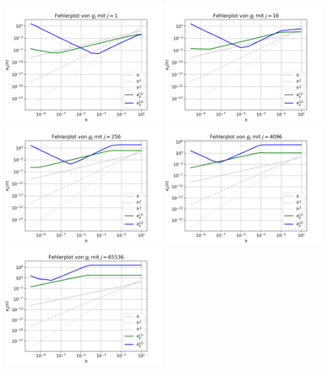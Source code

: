 \documentclass{scrartcl}
\begin{document}
\vspace{0.4cm}
{
  \centering
    \includegraphics[width=0.45\textwidth]{Grafiken/Fehlerplot_j1}
    \includegraphics[width=0.45\textwidth]{Grafiken/Fehlerplot_j16}\\
    \includegraphics[width=0.45\textwidth]{Grafiken/Fehlerplot_j256}
    \includegraphics[width=0.45\textwidth]{Grafiken/Fehlerplot_j4096}\\
    \includegraphics[width=0.45\textwidth]{Grafiken/Fehlerplot_j65536}
}
\end{document}
